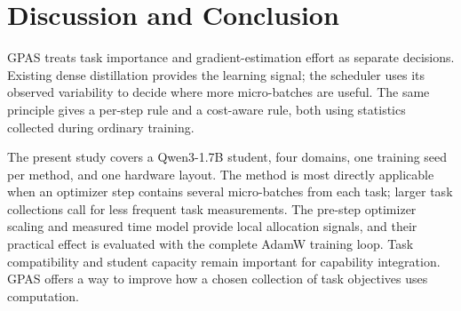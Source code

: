 \section{Discussion and Conclusion}
\label{sec:conclusion}

GPAS treats task importance and gradient-estimation effort as separate
decisions. Existing dense distillation provides the learning signal;
the scheduler uses its observed variability to decide where more
micro-batches are useful. The same principle gives a per-step rule and a
cost-aware rule, both using statistics collected during ordinary training.

The present study covers a Qwen3-1.7B student, four domains, one training
seed per method, and one hardware layout. The method is most directly
applicable when an optimizer step contains several micro-batches from each
task; larger task collections call for less frequent task measurements.
The pre-step optimizer scaling and measured time model provide local
allocation signals, and their practical effect is evaluated with the
complete AdamW training loop. Task compatibility and student capacity
remain important for capability integration. GPAS offers a way to improve
how a chosen collection of task objectives uses computation.
